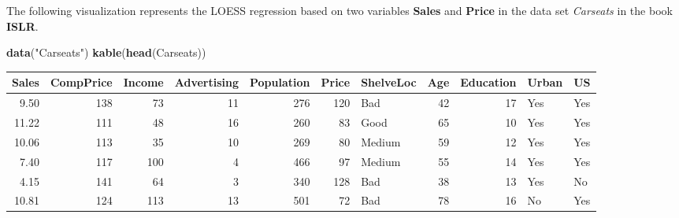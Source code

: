 \documentclass[
]{book}
\newenvironment{Shaded}{\begin{snugshade}}{\end{snugshade}}
\newcommand{\AttributeTok}[1]{\textcolor[rgb]{0.13,0.29,0.53}{#1}}
\newcommand{\CommentTok}[1]{\textcolor[rgb]{0.56,0.35,0.01}{\textit{#1}}}
\newcommand{\DecValTok}[1]{\textcolor[rgb]{0.00,0.00,0.81}{#1}}
\newcommand{\FloatTok}[1]{\textcolor[rgb]{0.00,0.00,0.81}{#1}}
\newcommand{\FunctionTok}[1]{\textcolor[rgb]{0.13,0.29,0.53}{\textbf{#1}}}
\newcommand{\NormalTok}[1]{#1}
\newcommand{\OtherTok}[1]{\textcolor[rgb]{0.56,0.35,0.01}{#1}}
\newcommand{\SpecialCharTok}[1]{\textcolor[rgb]{0.81,0.36,0.00}{\textbf{#1}}}
\newcommand{\StringTok}[1]{\textcolor[rgb]{0.31,0.60,0.02}{#1}}
\begin{document}
The following visualization represents the LOESS regression based on two variables \textbf{Sales} and \textbf{Price} in the data set \emph{Carseats} in the book \textbf{ISLR}.

\begin{Shaded}
\begin{Highlighting}[]
\FunctionTok{data}\NormalTok{(}\StringTok{"Carseats"}\NormalTok{)}
\FunctionTok{kable}\NormalTok{(}\FunctionTok{head}\NormalTok{(Carseats))}
\end{Highlighting}
\end{Shaded}

\begin{tabular}{r|r|r|r|r|r|l|r|r|l|l}
\hline
Sales & CompPrice & Income & Advertising & Population & Price & ShelveLoc & Age & Education & Urban & US\\
\hline
9.50 & 138 & 73 & 11 & 276 & 120 & Bad & 42 & 17 & Yes & Yes\\
\hline
11.22 & 111 & 48 & 16 & 260 & 83 & Good & 65 & 10 & Yes & Yes\\
\hline
10.06 & 113 & 35 & 10 & 269 & 80 & Medium & 59 & 12 & Yes & Yes\\
\hline
7.40 & 117 & 100 & 4 & 466 & 97 & Medium & 55 & 14 & Yes & Yes\\
\hline
4.15 & 141 & 64 & 3 & 340 & 128 & Bad & 38 & 13 & Yes & No\\
\hline
10.81 & 124 & 113 & 13 & 501 & 72 & Bad & 78 & 16 & No & Yes\\
\hline
\end{tabular}

\begin{Shaded}
\end{Shaded}
\end{document}
